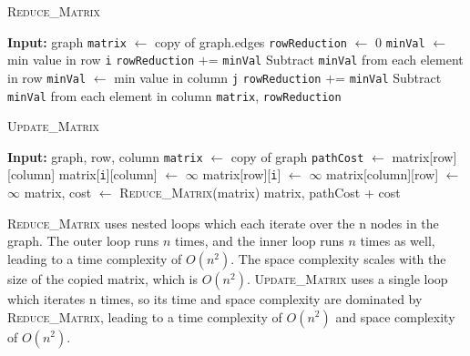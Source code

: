 \documentclass[12pt]{article}
\begin{document}
\newpage

\begin{algorithm}
    \caption{\textsc{Reduce\_Matrix}}
    \begin{algorithmic}[1]
        \State \textbf{Input:} graph
        \State \texttt{matrix} $\gets$ copy of graph.edges
        \State \texttt{rowReduction} $\gets$ 0
         
            \State \texttt{minVal} $\gets$ min value in row \texttt{i}
                \State \texttt{rowReduction} $+$= \texttt{minVal}
                \State Subtract \texttt{minVal} from each element in row 
            \EndIf
        \EndFor
         
            \State \texttt{minVal} $\gets$ min value in column \texttt{j}
                \State \texttt{rowReduction} $+$= \texttt{minVal}
                \State Subtract \texttt{minVal} from each element in column 
            \EndIf
        \EndFor
        \State \Return \texttt{matrix}, \texttt{rowReduction}
    \end{algorithmic}
\end{algorithm}

\begin{algorithm}
    \caption{\textsc{Update\_Matrix}}
    \begin{algorithmic}[1]
        \State \textbf{Input:} graph, row, column
        \State \texttt{matrix} $\gets$ copy of graph
        \State \texttt{pathCost} $\gets$ matrix[row][column]
         
            \State matrix[\texttt{i}][column] $\gets$ $\infty$
            \State matrix[row][\texttt{i}] $\gets$ $\infty$
        \EndFor
        \State matrix[column][row] $\gets$ $\infty$
        \State matrix, cost $\gets$ \textsc{Reduce\_Matrix}(matrix) 
        \State \Return matrix, pathCost + cost
    \end{algorithmic}
\end{algorithm}

\textsc{Reduce\_Matrix} uses nested loops which each iterate
over the n nodes in the graph. The outer loop runs $n$ times, and the inner loop
runs $n$ times as well, leading to a time complexity of $O(n^2)$. The space complexity
scales with the size of the copied matrix, which is $O(n^2)$. \textsc{Update\_Matrix} uses
a single loop which iterates n times, so its time and space complexity are dominated by
\textsc{Reduce\_Matrix}, leading to a time complexity of $O(n^2)$ and space complexity of
$O(n^2)$.
\end{document}
